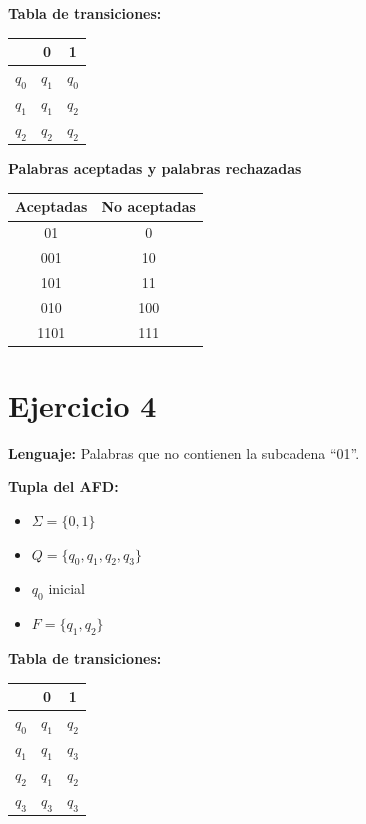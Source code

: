 \documentclass{article}
\begin{document}
\textbf{Tabla de transiciones:}
\begin{center}
\begin{tabular}{|c|c|c|}
\hline
 & 0 & 1 \\ \hline
$q_0$ & $q_1$ & $q_0$ \\ \hline
$q_1$ & $q_1$ & $q_2$ \\ \hline
$q_2$ & $q_2$ & $q_2$ \\ \hline

\end{tabular}
\end{center}

\textbf{Palabras aceptadas y palabras rechazadas}
\begin{center}
\begin{tabular}{|c|c|}
\hline
Aceptadas & No aceptadas \\
\hline
01 & 0 \\
001 & 10 \\
101 & 11 \\
010 & 100 \\
1101 & 111 \\
\hline
\end{tabular}
\end{center}

\section*{Ejercicio 4}
\textbf{Lenguaje:} Palabras que no contienen la subcadena “01”.  

\textbf{Tupla del AFD:}
\begin{itemize}
    \item $\Sigma = \{0,1\}$
    \item $Q = \{q_0, q_1, q_2, q_3\}$
    \item $q_0$ inicial
    \item $F = \{q_1, q_2\}$
\end{itemize}



\textbf{Tabla de transiciones:}
\begin{center}
\begin{tabular}{|c|c|c|}
\hline
 & 0 & 1 \\ \hline
$q_0$ & $q_1$ & $q_2$ \\ \hline
$q_1$ & $q_1$ & $q_3$ \\ \hline
$q_2$ & $q_1$ & $q_2$ \\ \hline
$q_3$ & $q_3$ & $q_3$ \\ \hline
\end{tabular}
\end{center}
\end{document}
